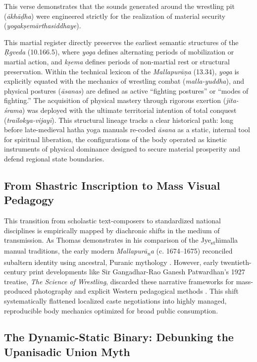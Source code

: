 \documentclass[11pt,twoside,letterpaper]{article}
\begin{document}
This verse demonstrates that the sounds generated around the wrestling pit (\textit{ākhāḍha}) were engineered strictly for the realization of material security (\textit{yogakṣemārthasiddhaye}). 

This martial register directly preserves the earliest semantic structures of the \textit{Ṛgveda} (10.166.5), where \textit{yoga} defines alternating periods of mobilization or martial action, and \textit{kṣema} defines periods of non-martial rest or structural preservation. Within the technical lexicon of the \textit{Mallapurāṇa} (13.34), \textit{yoga} is explicitly equated with the mechanics of wrestling combat (\textit{malla-yuddha}), and physical postures (\textit{āsanas}) are defined as active ``fighting postures'' or ``modes of fighting.'' The acquisition of physical mastery through rigorous exertion (\textit{jita-śrama}) was deployed with the ultimate territorial intention of total conquest (\textit{trailokya-vijayī}). This structural lineage tracks a clear historical path: long before late-medieval hatha yoga manuals re-coded \textit{āsana} as a static, internal tool for spiritual liberation, the configurations of the body operated as kinetic instruments of physical dominance designed to secure material prosperity and defend regional state boundaries.

\subsection{From Shastric Inscription to Mass Visual Pedagogy}
This transition from scholastic text-composers to standardized national disciplines is empirically mapped by diachronic shifts in the medium of transmission. As Thomas demonstrates in his comparison of the Jye\textsubscript{s}\textsubscript{t}h\={\i}malla manual traditions, the early modern \textit{Mallapur\={a}\textsubscript{n}a} (c. 1674–1675) reconciled subaltern identity using ancestral, Puranic mythology \cite{Thomas2025}. However, early twentieth-century print developments like Sir Gangadhar-Rao Ganesh Patwardhan's 1927 treatise, \textit{The Science of Wrestling}, discarded these narrative frameworks for mass-produced photography and explicit Western pedagogical methods \cite{Thomas2025}. This shift systematically flattened localized caste negotiations into highly managed, reproducible body mechanics optimized for broad public consumption.

\subsection{The Dynamic-Static Binary: Debunking the Upanisadic Union Myth}
\end{document}
